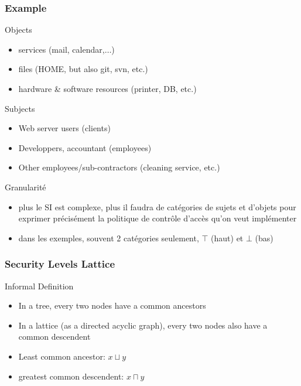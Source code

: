 \begin{reveals}
\begin{frame}
\end{frame}

\begin{frame}
  \frametitle{Example}
  
  \vfill

  \begin{block}{Objects}
    \begin{itemize}
    \item services (mail, calendar,\(\ldots\))
    \item files (HOME, but also git, svn, etc.)
    \item hardware \& software resources (printer, DB, etc.)
    \end{itemize}
  \end{block}

  \vfill

  \begin{block}{Subjects}
    \begin{itemize}
    \item Web server users (clients)
    \item Developpers, accountant (employees)
    \item Other employees/sub-contractors (cleaning service, etc.)
    \end{itemize}
  \end{block}

  \vfill

  \begin{block}{Granularité}
    \begin{itemize}
    \item plus le SI est complexe, plus il faudra de catégories de
      sujets et d'objets pour exprimer précisément la politique de
      contrôle d'accès qu'on veut implémenter
    \item dans les exemples, souvent 2 catégories seulement, \(\top\)
      (haut) et \(\bot\) (bas)
    \end{itemize}
  \end{block}

  \vfill
\end{frame}



\begin{frame}
  \frametitle{Security Levels Lattice}

  \begin{block}{Informal Definition}
    \begin{itemize}
    \item In a tree, every two nodes have a common ancestors
    \item In a lattice (as a directed acyclic graph), every two nodes
      also have a common descendent
    \item Least common ancestor: \(x\sqcup y\)
    \item greatest common descendent: \(x\sqcap y\) 
    \end{itemize}
  \end{block}


\end{frame}
\end{reveals}
